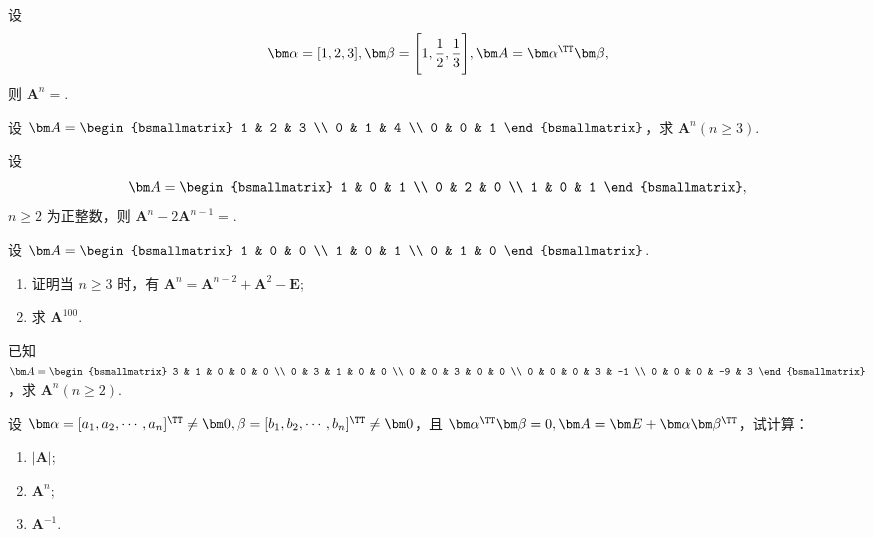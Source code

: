 	\begin{titwo}
		设
		\[
			\bm \alpha = [1,2,3], \bm \beta = \Biggl[ 1,\frac{1}{2},\frac{1}{3} \Biggr], \bm A = \bm \alpha^{\TT} \bm \beta,
		\]
		则 $\bm A^{n} = $\htwo.
	\end{titwo}

	\begin{titwo}
		设 $\bm A = \begin{bsmallmatrix}
			1 & 2 & 3 \\
			0 & 1 & 4 \\
			0 & 0 & 1
		\end{bsmallmatrix}$，求 $\bm A^{n} (n \geq 3)$.
	\end{titwo}

	\begin{titwo}
		设
		\[
			\bm A = \begin{bsmallmatrix}
				1 & 0 & 1 \\
				0 & 2 & 0 \\
				1 & 0 & 1
			\end{bsmallmatrix},
		\]
		$n \geq 2$ 为正整数，则 $\bm A^{n} - 2 \bm A^{n-1} = $\htwo.
	\end{titwo}

	\begin{titwo}
		设 $\bm A = \begin{bsmallmatrix}
			1 & 0 & 0 \\
			1 & 0 & 1 \\
			0 & 1 & 0
		\end{bsmallmatrix}$.
		\begin{enumerate}
			\item 证明当 $n \geq 3$ 时，有 $\bm A^{n} = \bm A^{n-2} + \bm A^{2} - \bm E$;
			\item 求 $\bm A^{100}$.
		\end{enumerate}
	\end{titwo}

	\begin{titwo}
		已知 $\bm A = \begin{bsmallmatrix}
			3 & 1 & 0 & 0 & 0 \\
			0 & 3 & 1 & 0 & 0 \\
			0 & 0 & 3 & 0 & 0 \\
			0 & 0 & 0 & 3 & -1 \\
			0 & 0 & 0 & -9 & 3
		\end{bsmallmatrix}$，求 $\bm A^{n}(n \geq 2)$.
	\end{titwo}

	\begin{titwo}
		设 $\bm \alpha = [a_{1},a_{2},\cdots,a_{n}]^{\TT} \ne \bm 0, \beta = [b_{1},\allowbreak b_{2},\allowbreak \cdots,\allowbreak b_{n}]^{\TT} \ne \bm 0$，且 $\bm \alpha^{\TT} \bm \beta = 0, \bm A = \bm E + \bm \alpha \bm \beta^{\TT}$，试计算：
		\begin{enumerate}
			\item $|\bm A|$;
			\item $\bm A^{n}$;
			\item $\bm A^{-1}$.
		\end{enumerate}
	\end{titwo}

